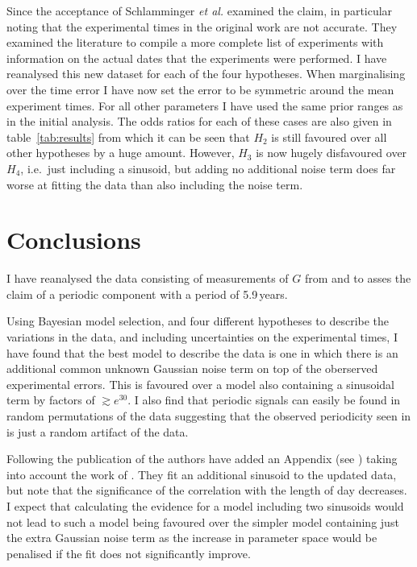 \documentclass[comment]{epl2}
\begin{document}
Since the acceptance of \cite{2015EL....11010002A} Schlamminger {\it et al.} \cite{2015arXiv150501774S}
examined the claim, in particular noting that the experimental times in the original work
are not accurate. They examined the literature to compile a more complete list of
experiments with information on the actual dates that the experiments were performed.
I have reanalysed this new dataset for each of the four hypotheses. When marginalising over the
time error I have now set the error to be symmetric around the mean experiment times.
For all other parameters I have used the same prior ranges as in the initial analysis.
The odds ratios for each of these cases are also given in table~\ref{tab:results} from which it can
be seen that $H_2$ is still favoured over all other hypotheses by a huge amount. However, $H_3$
is now hugely disfavoured over $H_4$, i.e.\ just including a sinusoid, but adding no additional noise
term does far worse at fitting the data than also including the noise term.

\section{Conclusions}

I have reanalysed the data consisting of measurements of $G$ from
\cite{2015EL....11010002A} and \cite{2015arXiv150501774S} to asses the claim of a periodic
component with a period of 5.9\,years.

Using Bayesian model selection, and four different hypotheses to describe the variations in the data, and including
uncertainties on the experimental times, I have found that the best model to describe the data is one in which
there is an additional common unknown Gaussian noise term on top of the oberserved experimental errors. This is 
favoured over a model also containing a sinusoidal term by factors of $\gtrsim e^{30}$. I also find that periodic
signals can easily be found in random permutations of the data suggesting that the observed periodicity seen in
\cite{2015EL....11010002A} is just a random artifact of the data.

Following the publication of \cite{2015EL....11010002A} the authors have added an Appendix (see
\cite{AndersonRevised}) taking into account the work of \cite{2015arXiv150501774S}. They fit an additional
sinusoid to the updated data,  but note that the significance of the correlation with the length of day decreases. 
I expect that calculating the evidence for a model including two sinusoids would not lead to such a model being
favoured over the simpler model containing just the
extra Gaussian noise term as the increase in parameter space would be penalised if the fit does not 
significantly improve.
\end{document}
